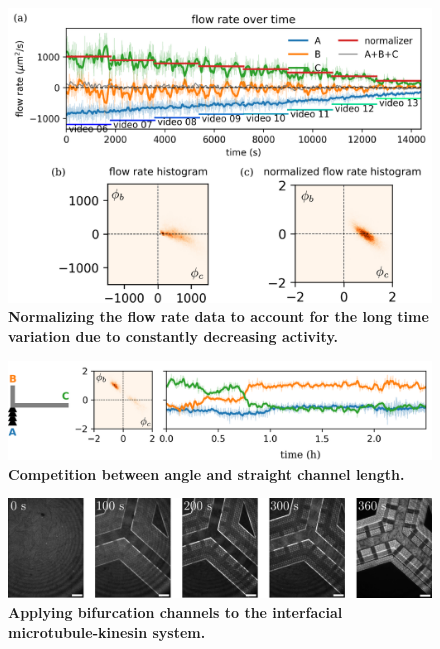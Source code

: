 \documentclass[%
10pt,
superscriptaddress,
 amsmath,amssymb,
 aps,prx,
]{revtex4-2}
\begin{document}
\begin{figure}[!h]
    \includegraphics[width=\textwidth]{a3-normalization-of-flow-rate}
    \caption{
    \textbf{Normalizing the flow rate data to account for the long time variation due to constantly decreasing activity.}
    }
    \label{fig:normalization-of-flow-rate}
\end{figure}

\begin{figure}[!h]
    \includegraphics[width=\textwidth]{a4-angle-length-competition}
    \caption{
    \textbf{Competition between angle and straight channel length.}
    }
    \label{fig:angle-length-competition}
\end{figure}

\begin{figure}[!h]
    \includegraphics[width=\textwidth]{a5-apply-grid}
    \caption{
    \textbf{Applying bifurcation channels to the interfacial microtubule-kinesin system.}
    }
    \label{fig:apply-grid}
\end{figure}
\end{document}
